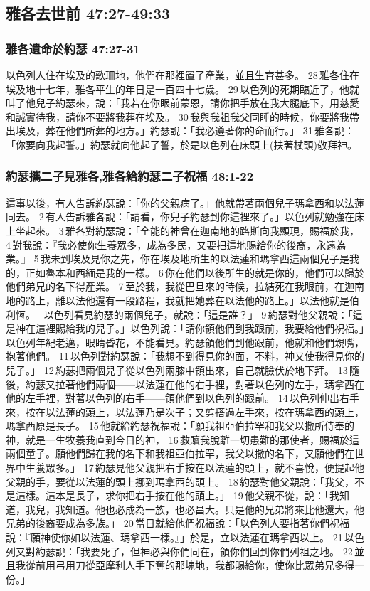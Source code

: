 \subsection{雅各去世前 47:27-49:33}

\subsubsection{雅各遺命於約瑟 47:27-31}
以色列人住在埃及的歌珊地，他們在那裡置了產業，並且生育甚多。 28 雅各住在埃及地十七年，雅各平生的年日是一百四十七歲。 29 以色列的死期臨近了，他就叫了他兒子約瑟來，說：「我若在你眼前蒙恩，請你把手放在我大腿底下，用慈愛和誠實待我，請你不要將我葬在埃及。 30 我與我祖我父同睡的時候，你要將我帶出埃及，葬在他們所葬的地方。」約瑟說：「我必遵著你的命而行。」 31 雅各說：「你要向我起誓。」約瑟就向他起了誓，於是以色列在床頭上(扶著杖頭)敬拜神。

\subsubsection{約瑟攜二子見雅各,雅各給約瑟二子祝福 48:1-22}
這事以後，有人告訴約瑟說：「你的父親病了。」他就帶著兩個兒子瑪拿西和以法蓮同去。 2 有人告訴雅各說：「請看，你兒子約瑟到你這裡來了。」以色列就勉強在床上坐起來。 3 雅各對約瑟說：「全能的神曾在迦南地的路斯向我顯現，賜福於我， 4 對我說：『我必使你生養眾多，成為多民，又要把這地賜給你的後裔，永遠為業。』 5 我未到埃及見你之先，你在埃及地所生的以法蓮和瑪拿西這兩個兒子是我的，正如魯本和西緬是我的一樣。 6 你在他們以後所生的就是你的，他們可以歸於他們弟兄的名下得產業。 7 至於我，我從巴旦來的時候，拉結死在我眼前，在迦南地的路上，離以法他還有一段路程，我就把她葬在以法他的路上。」以法他就是伯利恆。
 
以色列看見約瑟的兩個兒子，就說：「這是誰？」 9 約瑟對他父親說：「這是神在這裡賜給我的兒子。」以色列說：「請你領他們到我跟前，我要給他們祝福。」以色列年紀老邁，眼睛昏花，不能看見。約瑟領他們到他跟前，他就和他們親嘴，抱著他們。 11 以色列對約瑟說：「我想不到得見你的面，不料，神又使我得見你的兒子。」 12 約瑟把兩個兒子從以色列兩膝中領出來，自己就臉伏於地下拜。 13 隨後，約瑟又拉著他們兩個——以法蓮在他的右手裡，對著以色列的左手，瑪拿西在他的左手裡，對著以色列的右手——領他們到以色列的跟前。 14 以色列伸出右手來，按在以法蓮的頭上，以法蓮乃是次子；又剪搭過左手來，按在瑪拿西的頭上，瑪拿西原是長子。 15 他就給約瑟祝福說：「願我祖亞伯拉罕和我父以撒所侍奉的神，就是一生牧養我直到今日的神， 16 救贖我脫離一切患難的那使者，賜福於這兩個童子。願他們歸在我的名下和我祖亞伯拉罕，我父以撒的名下，又願他們在世界中生養眾多。」 17 約瑟見他父親把右手按在以法蓮的頭上，就不喜悅，便提起他父親的手，要從以法蓮的頭上挪到瑪拿西的頭上。 18 約瑟對他父親說：「我父，不是這樣。這本是長子，求你把右手按在他的頭上。」 19 他父親不從，說：「我知道，我兒，我知道。他也必成為一族，也必昌大。只是他的兄弟將來比他還大，他兄弟的後裔要成為多族。」 20 當日就給他們祝福說：「以色列人要指著你們祝福說：『願神使你如以法蓮、瑪拿西一樣。』」於是，立以法蓮在瑪拿西以上。 21 以色列又對約瑟說：「我要死了，但神必與你們同在，領你們回到你們列祖之地。 22 並且我從前用弓用刀從亞摩利人手下奪的那塊地，我都賜給你，使你比眾弟兄多得一份。」


